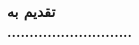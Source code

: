 \clearpage
\thispagestyle{empty}

{\BNazaninScaleOne
{\fontsize{20pt}{0}\selectfont \bfseries
\noindent
تقدیم به
\\[1cm]
\hspace*{1cm}
............................
}}
		
\restoregeometry